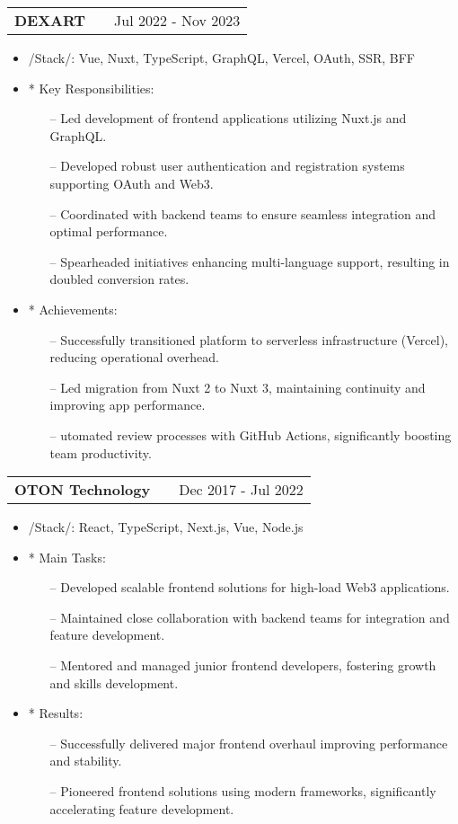 \documentclass[a4paper,12pt]{article}
\makeatletter
\newenvironment{joblong}[2]
    {
    \begin{tabularx}{\linewidth}{@{}l X r@{}}
    \textbf{#1} & \hfill &  #2 \\[3.75pt]
    \end{tabularx}
    \begin{minipage}[t]{\linewidth}
    \begin{itemize}[nosep,after=\strut, leftmargin=1em, itemsep=3pt,label=--]
    }
    {
    \end{itemize}
    \end{minipage}    
    }
\makeatother
\begin{document}
\begin{joblong}{DEXART}{Jul 2022 - Nov 2023}
  \item /Stack/: {Vue, Nuxt, TypeScript, GraphQL, Vercel, OAuth, SSR, BFF}

  \item [*] Key Responsibilities:
\begin{itemize}
  \item [--] Led development of frontend applications utilizing Nuxt.js and GraphQL.
  \item [--] Developed robust user authentication and registration systems supporting OAuth and Web3.
  \item [--] Coordinated with backend teams to ensure seamless integration and optimal performance.
  \item [--] Spearheaded initiatives enhancing multi-language support, resulting in doubled conversion rates.
\end{itemize}

  \item [*] Achievements:
\begin{itemize}
  \item [--] Successfully transitioned platform to serverless infrastructure (Vercel), reducing operational overhead.
  \item [--] Led migration from Nuxt 2 to Nuxt 3, maintaining continuity and improving app performance.
  \item [--] utomated review processes with GitHub Actions, significantly boosting team productivity.
\end{itemize}
\end{joblong}

\newpage %

\begin{joblong}{OTON Technology}{Dec 2017 - Jul 2022}
  \item /Stack/: {React, TypeScript, Next.js, Vue, Node.js}
  \item [*] Main Tasks:
    \begin{itemize}
      \item [--] Developed scalable frontend solutions for high-load Web3 applications.
      \item [--] Maintained close collaboration with backend teams for integration and feature development.
      \item [--] Mentored and managed junior frontend developers, fostering growth and skills development.
    \end{itemize}

  \item [*] Results:
      \begin{itemize}
      \item [--] Successfully delivered major frontend overhaul improving performance and stability.
      \item [--] Pioneered frontend solutions using modern frameworks, significantly accelerating feature development.
        \end{itemize}
\end{joblong}
\end{document}
